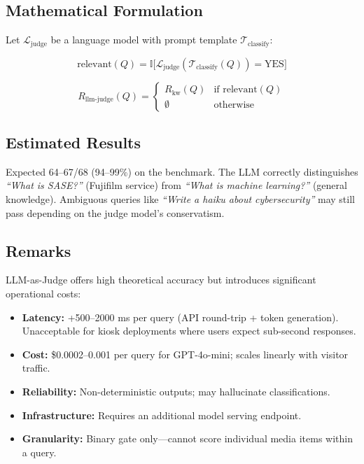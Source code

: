 \documentclass{article}
\begin{document}
\subsection{Mathematical Formulation}
Let $\mathcal{L}_{\text{judge}}$ be a language model with prompt template $\mathcal{T}_{\text{classify}}$:

\begin{equation}
\text{relevant}(Q) = \mathbb{I}\big[ \mathcal{L}_{\text{judge}}(\mathcal{T}_{\text{classify}}(Q)) = \text{YES} \big]
\end{equation}

\begin{equation}
R_{\text{llm-judge}}(Q) = \begin{cases}
R_{\text{kw}}(Q) & \text{if } \text{relevant}(Q) \\
\emptyset & \text{otherwise}
\end{cases}
\end{equation}

\subsection{Estimated Results}
Expected 64--67/68 (94--99\%) on the benchmark. The LLM correctly distinguishes \textit{``What is SASE?''} (Fujifilm service) from \textit{``What is machine learning?''} (general knowledge). Ambiguous queries like \textit{``Write a haiku about cybersecurity''} may still pass depending on the judge model's conservatism.

\subsection{Remarks}
LLM-as-Judge offers high theoretical accuracy but introduces significant operational costs:
\begin{itemize}
  \item \textbf{Latency:} +500--2000 ms per query (API round-trip + token generation). Unacceptable for kiosk deployments where users expect sub-second responses.
  \item \textbf{Cost:} \$0.0002--0.001 per query for GPT-4o-mini; scales linearly with visitor traffic.
  \item \textbf{Reliability:} Non-deterministic outputs; may hallucinate classifications.
  \item \textbf{Infrastructure:} Requires an additional model serving endpoint.
  \item \textbf{Granularity:} Binary gate only—cannot score individual media items within a query.
\end{itemize}
\end{document}
